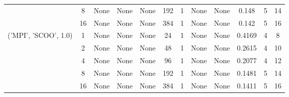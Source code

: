 \begin{tabular}{cccccccccccc}
& 8& None& None& None& 192& 1& None& None& 0.148& 5& 14\\
& 16& None& None& None& 384& 1& None& None& 0.142& 5& 16\\
\hline
\multirow{5}{*}{('MPI', 'SCOO', 1.0)}& 1& None& None& None& 24& 1& None& None& 0.4169& 4& 8\\
& 2& None& None& None& 48& 1& None& None& 0.2615& 4& 10\\
& 4& None& None& None& 96& 1& None& None& 0.2077& 4& 12\\
& 8& None& None& None& 192& 1& None& None& 0.1481& 5& 14\\
& 16& None& None& None& 384& 1& None& None& 0.1411& 5& 16\\
\hline
\end{tabular}
